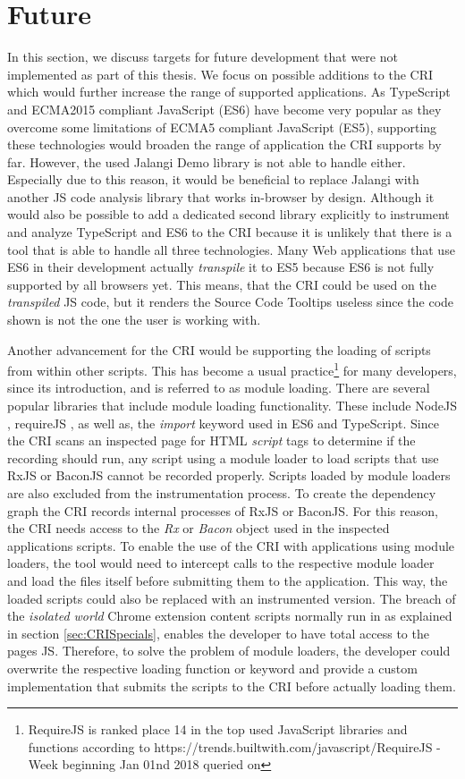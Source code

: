 \section{Future}
In this section, we discuss targets for future development that were not implemented as part of this thesis. We focus on possible additions to the CRI which would further increase the range of supported applications. As TypeScript and ECMA2015 compliant JavaScript (ES6) have become very popular as they overcome some limitations of ECMA5 compliant JavaScript (ES5), supporting these technologies would broaden the range of application the CRI supports by far. However, the used Jalangi Demo library is not able to handle either. Especially due to this reason, it would be beneficial to replace Jalangi with another JS code analysis library that works in-browser by design. Although it would also be possible to add a dedicated second library explicitly to instrument and analyze TypeScript and ES6 to the CRI because it is unlikely that there is a tool that is able to handle all three technologies. Many Web applications that use ES6 in their development actually \emph{transpile} it to ES5 because ES6 is not fully supported by all browsers yet. This means, that the CRI could be used on the \emph{transpiled} JS code, but it renders the Source Code Tooltips useless since the code shown is not the one the user is working with.

Another advancement for the CRI would be supporting the loading of scripts from within other scripts. This has become a usual practice\footnote{RequireJS is ranked place 14 in the top used JavaScript libraries and functions according to https://trends.builtwith.com/javascript/RequireJS - Week beginning Jan 01nd 2018 queried on \date{2018-01-03}} for many developers, since its introduction, and is referred to as module loading. There are several popular libraries that include module loading functionality. These include NodeJS \cite{NodeJS}, requireJS \cite{RequireJS}, as well as, the \emph{import} keyword used in ES6 and TypeScript. Since the CRI scans an inspected page for HTML \emph{script} tags to determine if the recording should run, any script using a module loader to load scripts that use RxJS or BaconJS cannot be recorded properly. Scripts loaded by module loaders are also excluded from the instrumentation process. To create the dependency graph the CRI records internal processes of RxJS or BaconJS. For this reason, the CRI needs access to the \emph{Rx} or \emph{Bacon} object used in the inspected applications scripts. To enable the use of the CRI with applications using module loaders, the tool would need to intercept calls to the respective module loader and load the files itself before submitting them to the application. This way, the loaded scripts could also be replaced with an instrumented version. The breach of the \emph{isolated world} Chrome extension content scripts normally run in as explained in section \ref{sec:CRISpecials}, enables the developer to have total access to the pages JS. Therefore, to solve the problem of module loaders, the developer could overwrite the respective loading function or keyword and provide a custom implementation that submits the scripts to the CRI before actually loading them.
	
